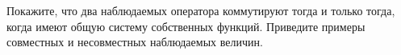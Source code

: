 \documentclass[__main__.tex]{subfiles}
\begin{document}
Покажите, что два наблюдаемых оператора коммутируют тогда и только тогда, когда имеют общую систему собственных функций. Приведите примеры совместных и несовместных наблюдаемых величин.\\ 

\end{document}
